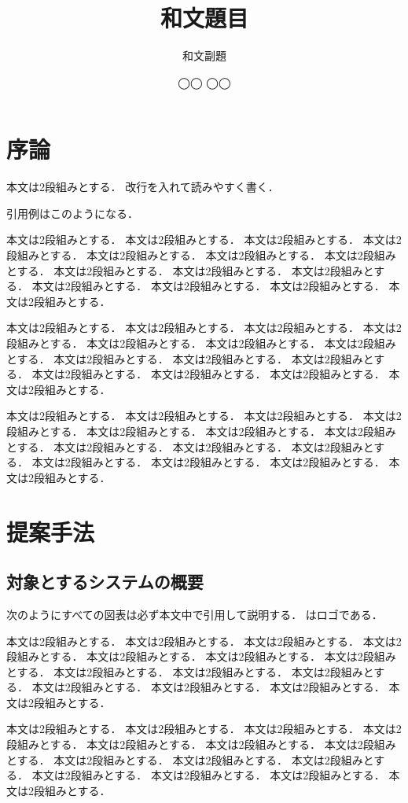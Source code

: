 \documentclass{/workdir/classes/summary}
\title{和文題目}
\subtitle{和文副題} %
\author{◯◯ ◯◯}
\begin{document}
\maketitle

\section{序論}
本文は2段組みとする．
改行を入れて読みやすく書く．

引用例は\cite{Schlick1994}\cite{Chikushi2020}このようになる．

本文は2段組みとする．
本文は2段組みとする．
本文は2段組みとする．
本文は2段組みとする．
本文は2段組みとする．
本文は2段組みとする．
本文は2段組みとする．
本文は2段組みとする．
本文は2段組みとする．
本文は2段組みとする．
本文は2段組みとする．
本文は2段組みとする．
本文は2段組みとする．
本文は2段組みとする．

本文は2段組みとする．
本文は2段組みとする．
本文は2段組みとする．
本文は2段組みとする．
本文は2段組みとする．
本文は2段組みとする．
本文は2段組みとする．
本文は2段組みとする．
本文は2段組みとする．
本文は2段組みとする．
本文は2段組みとする．
本文は2段組みとする．
本文は2段組みとする．
本文は2段組みとする．

本文は2段組みとする．
本文は2段組みとする．
本文は2段組みとする．
本文は2段組みとする．
本文は2段組みとする．
本文は2段組みとする．
本文は2段組みとする．
本文は2段組みとする．
本文は2段組みとする．
本文は2段組みとする．
本文は2段組みとする．
本文は2段組みとする．
本文は2段組みとする．
本文は2段組みとする．

\section{提案手法}
\subsection{対象とするシステムの概要}
次のようにすべての図表は必ず本文中で引用して説明する．
はロゴである．

本文は2段組みとする．
本文は2段組みとする．
本文は2段組みとする．
本文は2段組みとする．
本文は2段組みとする．
本文は2段組みとする．
本文は2段組みとする．
本文は2段組みとする．
本文は2段組みとする．
本文は2段組みとする．
本文は2段組みとする．
本文は2段組みとする．
本文は2段組みとする．
本文は2段組みとする．

本文は2段組みとする．
本文は2段組みとする．
本文は2段組みとする．
本文は2段組みとする．
本文は2段組みとする．
本文は2段組みとする．
本文は2段組みとする．
本文は2段組みとする．
本文は2段組みとする．
本文は2段組みとする．
本文は2段組みとする．
本文は2段組みとする．
本文は2段組みとする．
本文は2段組みとする．
\end{document}
